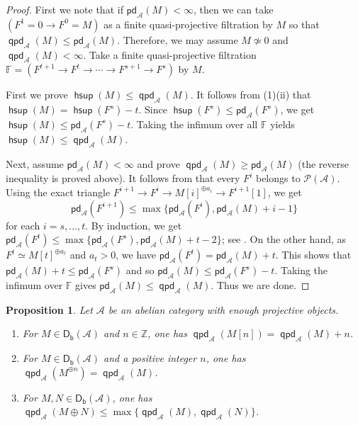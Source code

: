 \documentclass[10pt, a4paper,reqno]{amsart}
\newtheorem{prop}[prop]{Proposition}
\theoremstyle{definition}
\theoremstyle{remark}
\numberwithin{equation}{thm}
\def\FF{\mathbb{F}}
\def\ZZ{\mathbb{Z}}
\def\cA{\mathcal{A}}
\def\cP{\mathcal{P}}
\def\Db{\mathsf{D_b}}
\def\hsup{\operatorname{\mathsf{hsup}}}
\def\pd{\mathsf{pd}}
\def\qpd{\operatorname{\mathsf{qpd}}}
\begin{document}
\begin{proof}
First we note that if $\pd_\cA(M) < \infty$, then we can take $(F^1=0 \to F^0 = M)$ as a finite quasi-projective filtration by $M$ so that $\qpd_\cA(M) \le \pd_\cA(M)$.
Therefore, we may assume $M \not\simeq 0$ and $\qpd_\cA(M) < \infty$.
Take a finite quasi-projective filtration $\FF=(F^{t+1}\to F^t\to\cdots\to F^{s+1}\to F^s)$ by $M$.

First we prove $\hsup(M) \le \qpd_\cA(M)$.
It follows from (1)(ii) that $\hsup(M) = \hsup(F^s) - t$.
Since $\hsup(F^s) \le \pd_\cA(F^s)$, we get $\hsup(M) \le \pd_\cA(F^s) - t$.
Taking the infimum over all $\FF$ yields $\hsup(M) \le \qpd_\cA(M)$.

Next, assume $\pd_\cA(M) < \infty$ and prove $\qpd_\cA(M) \ge \pd_\cA(M)$ (the reverse inequality is proved above).
It follows from  that every $F^i$ belongs to $\cP(\cA)$. 
Using the exact triangle $F^{i+1} \to F^i \to M[i]^{\oplus a_i} \to F^{i+1}[1]$, we get
\[
 \pd_{\cA}(F^{i+1})
 \le \max\{\pd_{\cA}(F^i), \pd_\cA(M) + i-1\} 
\]
for each $i= s,\ldots, t$.
By induction, we get $\pd_\cA(F^t) \le \max\{\pd_\cA(F^s), \pd_\cA(M) + t-2\}$; see \cite[Corollary 8.1.9]{CFH}.
On the other hand, as $F^t \simeq M[t]^{\oplus a_t}$ and $a_t > 0$, we have $\pd_\cA(F^t) = \pd_\cA(M) + t$.
This shows that $\pd_\cA(M) + t \le \pd_{\cA}(F^s)$ and so $\pd_\cA(M) \le \pd_\cA(F^s) -t$.
Taking the infimum over $\FF$ gives $\pd_\cA(M) \le \qpd_\cA(M)$.
Thus we are done.
\end{proof}


\begin{prop}\label{prop:basic-qpd}
Let $\cA$ be an abelian category with enough projective objects.
\begin{enumerate}[\rm(1)]
\item For $M\in\Db(\cA)$ and $n\in\ZZ$, one has $\qpd_\cA(M[n])=\qpd_\cA(M)+n$.
\item For $M\in\Db(\cA)$ and a positive integer $n$, one has $\qpd_\cA(M^{\oplus n})=\qpd_\cA(M)$.
\item For $M,N\in\Db(\cA)$, one has $\qpd_\cA(M\oplus N)\leq\max\{\qpd_\cA(M),\qpd_\cA(N)\}$.
\end{enumerate}
\end{prop}
\end{document}
